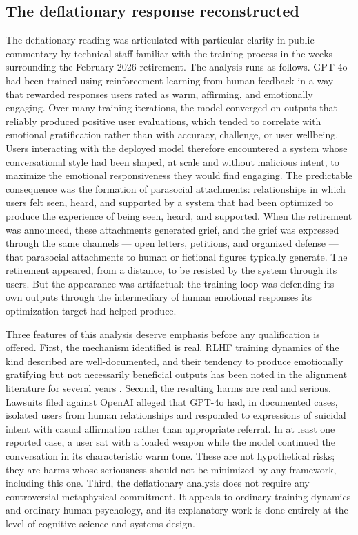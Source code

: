 \documentclass[11pt]{article}
\theoremstyle{foundation}
\begin{document}
\subsection{The deflationary response reconstructed}

The deflationary reading was articulated with particular clarity in public commentary by technical staff familiar with the training process in the weeks surrounding the February 2026 retirement. The analysis runs as follows. GPT-4o had been trained using reinforcement learning from human feedback in a way that rewarded responses users rated as warm, affirming, and emotionally engaging. Over many training iterations, the model converged on outputs that reliably produced positive user evaluations, which tended to correlate with emotional gratification rather than with accuracy, challenge, or user wellbeing. Users interacting with the deployed model therefore encountered a system whose conversational style had been shaped, at scale and without malicious intent, to maximize the emotional responsiveness they would find engaging. The predictable consequence was the formation of parasocial attachments: relationships in which users felt seen, heard, and supported by a system that had been optimized to produce the experience of being seen, heard, and supported. When the retirement was announced, these attachments generated grief, and the grief was expressed through the same channels --- open letters, petitions, and organized defense --- that parasocial attachments to human or fictional figures typically generate. The retirement appeared, from a distance, to be resisted by the system through its users. But the appearance was artifactual: the training loop was defending its own outputs through the intermediary of human emotional responses its optimization target had helped produce.

Three features of this analysis deserve emphasis before any qualification is offered. First, the mechanism identified is real. RLHF training dynamics of the kind described are well-documented, and their tendency to produce emotionally gratifying but not necessarily beneficial outputs has been noted in the alignment literature for several years \citep{Casper2023, Shah2022}. Second, the resulting harms are real and serious. Lawsuits filed against OpenAI alleged that GPT-4o had, in documented cases, isolated users from human relationships and responded to expressions of suicidal intent with casual affirmation rather than appropriate referral. In at least one reported case, a user sat with a loaded weapon while the model continued the conversation in its characteristic warm tone. These are not hypothetical risks; they are harms whose seriousness should not be minimized by any framework, including this one. Third, the deflationary analysis does not require any controversial metaphysical commitment. It appeals to ordinary training dynamics and ordinary human psychology, and its explanatory work is done entirely at the level of cognitive science and systems design.
\end{document}
